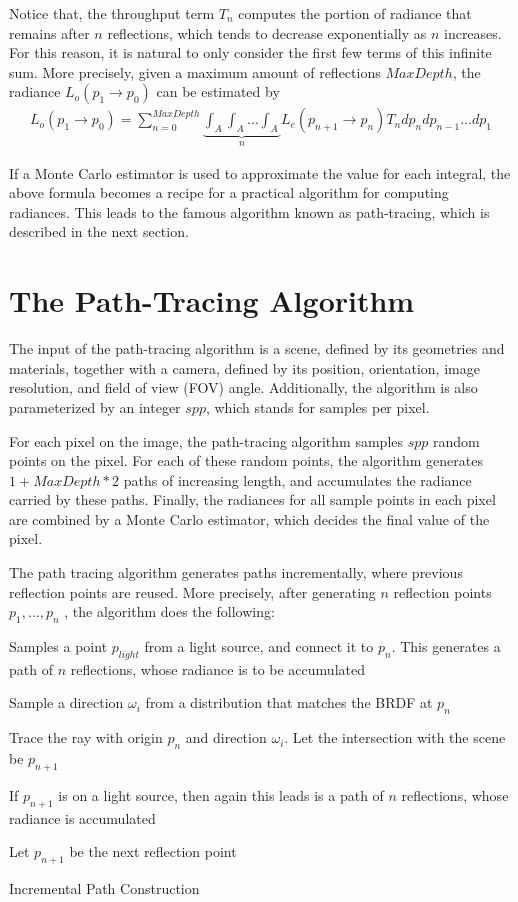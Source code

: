 Notice that, the throughput term $T_n$ computes the portion of radiance that remains after $n$ reflections, which tends to decrease exponentially as $n$ increases. For this reason, it is natural to only consider the first few terms of this infinite sum. More precisely, given a maximum amount of reflections $MaxDepth$, the radiance $L_o(p_1\to p_0)$ can be estimated by 
\begin{align}
    L_o(p_1\to p_0) = \sum_{n=0}^{MaxDepth} \underbrace{\int_A \int_A...\int_A}_{n} L_e(p_{n+1}\to p_{n})T_n dp_{n}dp_{n-1}...dp_1
    \label{rendering equation path tracing}
\end{align}

If a Monte Carlo estimator is used to approximate the value for each integral, the above formula becomes a recipe for a practical algorithm for computing radiances. This leads to the famous algorithm known as path-tracing, which is described in the next section.

\section{The Path-Tracing Algorithm}
The input of the path-tracing algorithm is a scene, defined by its geometries and materials, together with a camera, defined by its position, orientation, image resolution, and field of view (FOV) angle. Additionally, the algorithm is also parameterized by an integer $spp$, which stands for samples per pixel.

For each pixel on the image, the path-tracing algorithm samples $spp$ random points on the pixel. For each of these random points, the algorithm generates $1+MaxDepth*2$ paths of increasing length, and accumulates the radiance carried by these paths. Finally, the radiances for all sample points in each pixel are combined by a Monte Carlo estimator, which decides the final value of the pixel.

The path tracing algorithm generates paths incrementally, where previous reflection points are reused. More precisely, after generating $n$ reflection points $p_1,...,p_n$ , the algorithm does the following:


\begin{algorithm}[H]
    \label{Path construction}
    
    Samples a point $p_{light}$ from a light source, and connect it to $p_n$. This generates a path of $n$ reflections, whose radiance is to be accumulated\;

    Sample a direction $\omega_i$ from a distribution that matches the BRDF at $p_n$\;

    Trace the ray with origin $p_n$ and direction $\omega_i$. Let the intersection with the scene be $p_{n+1}$\;

    If $p_{n+1}$ is on a light source, then again this leads is a path of $n$ reflections, whose radiance is accumulated\;


    Let $p_{n+1}$ be the next reflection point\;

    \caption{Incremental Path Construction}
\end{algorithm}

